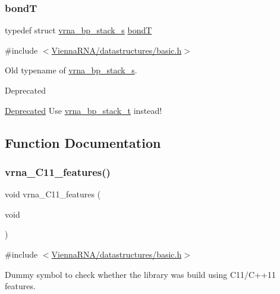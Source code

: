\subsubsection{\texorpdfstring{bondT}{bondT}}
{\footnotesize\ttfamily typedef struct \mbox{\hyperlink{group__data__structures_structvrna__bp__stack__s}{vrna\+\_\+bp\+\_\+stack\+\_\+s}} \mbox{\hyperlink{group__data__structures_gaaeed53a7508c6ce549a98223e94b25df}{bondT}}}



{\ttfamily \#include $<$\mbox{\hyperlink{datastructures_2basic_8h}{Vienna\+R\+N\+A/datastructures/basic.\+h}}$>$}



Old typename of \mbox{\hyperlink{group__data__structures_structvrna__bp__stack__s}{vrna\+\_\+bp\+\_\+stack\+\_\+s}}. 

\begin{DoxyRefDesc}{Deprecated}
\item[\mbox{\hyperlink{deprecated__deprecated000216}{Deprecated}}]Use \mbox{\hyperlink{group__data__structures_gaa651bda42e7692f08cb603cd6834b0ee}{vrna\+\_\+bp\+\_\+stack\+\_\+t}} instead! \end{DoxyRefDesc}


\subsection{Function Documentation}
\mbox{\label{group__data__structures_ga21744ae2d6a17309f9327d3547cef0cb}} 
\subsubsection{\texorpdfstring{vrna\_C11\_features()}{vrna\_C11\_features()}}
{\footnotesize\ttfamily void vrna\+\_\+\+C11\+\_\+features (\begin{DoxyParamCaption}\item[{void}]{ }\end{DoxyParamCaption})}



{\ttfamily \#include $<$\mbox{\hyperlink{datastructures_2basic_8h}{Vienna\+R\+N\+A/datastructures/basic.\+h}}$>$}



Dummy symbol to check whether the library was build using C11/\+C++11 features. 

